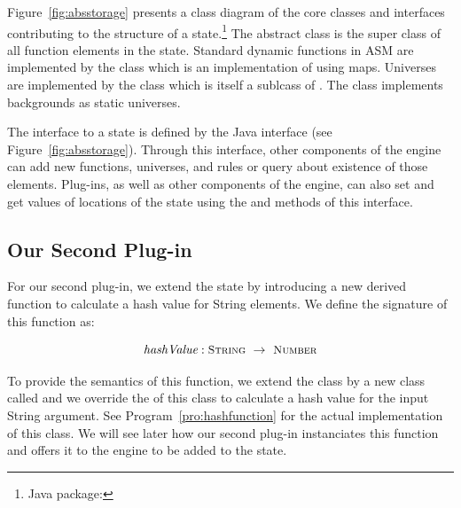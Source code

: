 \documentclass{article}
\begin{document}
Figure~\ref{fig:absstorage} presents a class diagram of the core classes and interfaces
contributing to the structure of a \CoreASM state.\footnote{Java package:  }
The abstract class  is the super
class of all function elements in the state.  Standard dynamic functions in ASM are
implemented by the  class
which is an implementation of  using maps.  Universes are
implemented by the  class which
is itself a sublcass of . The
 class implements backgrounds
as static universes.

The interface to a \CoreASM state is defined by the Java interface
 (see Figure~\ref{fig:absstorage}).  Through this
interface, other components of the engine can add new functions, universes, and
rules or query about existence of those elements.  Plug-ins, as well as other
components of the engine, can also set and get values of locations of the state
using the  and  methods of this interface.
   
\subsection{Our Second Plug-in}

For our second plug-in, we extend the \CoreASM state by introducing a new derived function 
to calculate a hash value for String elements. We define the signature of this function
as:

\[ \mbox{\it hashValue}: \mbox{\scshape\small String}~\rightarrow~\mbox{\scshape\small Number} \]

To provide the semantics of this function, we extend the  class by 
a new class called  and we override the  of this 
class to calculate a hash value for the input String argument. See Program~\ref{pro:hashfunction}
for the actual implementation of this class. We will see later how our second plug-in instanciates 
this function and offers it to the engine to be added to the \CoreASM state.
\end{document}
